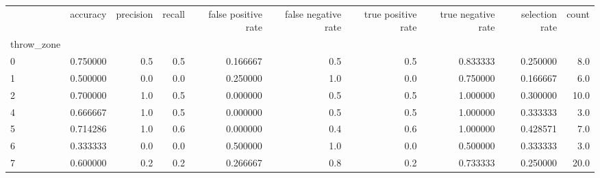 \begin{tabular}{lrrrrrrrrr}
\toprule
{} &  accuracy &  precision &  recall &  false positive rate &  false negative rate &  true positive rate &  true negative rate &  selection rate &  count \\
throw\_zone &           &            &         &                      &                      &                     &                     &                 &        \\
\midrule
0          &  0.750000 &        0.5 &     0.5 &             0.166667 &                  0.5 &                 0.5 &            0.833333 &        0.250000 &    8.0 \\
1          &  0.500000 &        0.0 &     0.0 &             0.250000 &                  1.0 &                 0.0 &            0.750000 &        0.166667 &    6.0 \\
2          &  0.700000 &        1.0 &     0.5 &             0.000000 &                  0.5 &                 0.5 &            1.000000 &        0.300000 &   10.0 \\
4          &  0.666667 &        1.0 &     0.5 &             0.000000 &                  0.5 &                 0.5 &            1.000000 &        0.333333 &    3.0 \\
5          &  0.714286 &        1.0 &     0.6 &             0.000000 &                  0.4 &                 0.6 &            1.000000 &        0.428571 &    7.0 \\
6          &  0.333333 &        0.0 &     0.0 &             0.500000 &                  1.0 &                 0.0 &            0.500000 &        0.333333 &    3.0 \\
7          &  0.600000 &        0.2 &     0.2 &             0.266667 &                  0.8 &                 0.2 &            0.733333 &        0.250000 &   20.0 \\
\bottomrule
\end{tabular}
